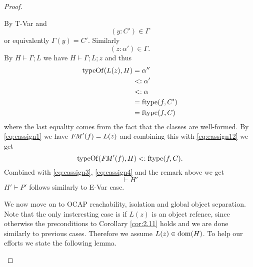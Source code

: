 \begin{proof}
\begin{description}
\begin{description}
\begin{description}
              By {\sc T-Var} and 
              \begin{equation}\label{eq:eassign10}
                (y: C') \in \Gamma 
              \end{equation}
              or equivalently $\Gamma(y) = C'$.
              Similarly
              \begin{equation} \label{eq:eassign11}
                (z: \alpha') \in \Gamma.
              \end{equation}
              By $H \vdash \Gamma; L$ we have $H \vdash \Gamma; L; z$ and thus
              \begin{equation} \label{eq:eassign12}
                \begin{aligned}
                  \mbox{$\mathrm{typeOf}$}(L(z), H) &= \alpha'' \\ 
                                   &<: \alpha' \\ 
                                   &<: \alpha \\ 
                                   &= \mbox{$\mathrm{ftype}$}(f, C') \\ 
                                   &= \mbox{$\mathrm{ftype}$}(f, C)
                \end{aligned}
              \end{equation}
              where the last equality comes from the fact that the classes are
              well-formed. By \eqref{eq:eassign1} we have $\mathit{FM}'(f) = L(z)$ and
              combining this with \eqref{eq:eassign12} we get
              \begin{equation} \label{eq:eassign13}
                \mbox{$\mathrm{typeOf}$}(\mathit{FM}'(f), H) <: \mbox{$\mathrm{ftype}$}(f, C).
              \end{equation}
              Combined with \eqref{eq:eassign3}, \eqref{eq:eassign4} and the
              remark above we get
              \begin{equation*} 
                \vdash H'
              \end{equation*}
              $H' \vdash P'$ follows similarly to {\sc E-Var} case.

              We now move on to OCAP reachability, isolation and global object
              separation.  Note that the only insteresting case is if $L(z)$ is
              an object refence, since otherwise the preconditions to Corollary
              \ref{cor:2.11} holds and we are done similarly to previous cases.
              Therefore we assume $L(z) \in \mbox{$\mathrm{dom}$}(H)$.  To help our efforts we
              state the following lemma.


\end{description}
\end{description}
\end{description}
\end{proof}
